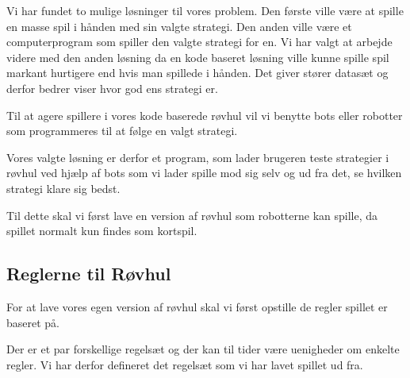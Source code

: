 \documentclass[a4paper, 12pt]{article}
\begin{document}
\begin{multicols}{2}
Vi har fundet to mulige løsninger til vores problem. Den første ville være at spille en masse spil i hånden med sin valgte strategi. Den anden ville være et computerprogram som spiller den valgte strategi for en. Vi har valgt at arbejde videre med den anden løsning da en kode baseret løsning ville kunne spille spil markant hurtigere end hvis man spillede i hånden. Det giver stører datasæt og derfor bedrer viser hvor god ens strategi er.

Til at agere spillere i vores kode baserede røvhul vil vi benytte bots eller robotter som programmeres til at følge en valgt strategi.

Vores valgte løsning er derfor et program, som lader brugeren teste strategier i røvhul ved hjælp af bots som vi lader spille mod sig selv og ud fra det, se hvilken strategi klare sig bedst.

Til dette skal vi først lave en version af røvhul som robotterne kan spille, da spillet normalt kun findes som kortspil. 

\subsection{Reglerne til Røvhul}
For at lave vores egen version af røvhul skal vi først opstille de regler spillet er baseret på.

Der er et par forskellige regelsæt og der kan til tider være uenigheder om enkelte regler. Vi har derfor defineret det regelsæt som vi har lavet spillet ud fra.


\end{multicols}
\end{document}
